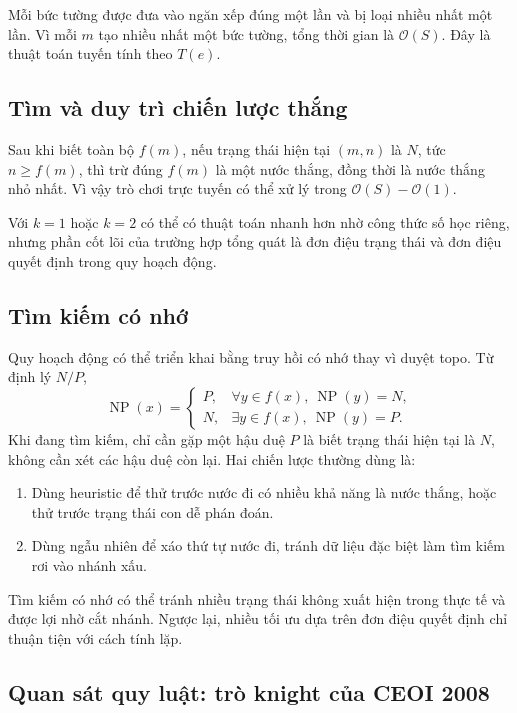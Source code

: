 \documentclass[11pt]{article}
\newcommand{\Oh}{\mathcal{O}}
\newcommand{\NP}{\operatorname{NP}}
\begin{document}
Mỗi bức tường được đưa vào ngăn xếp đúng một lần và bị loại nhiều nhất một
lần. Vì mỗi \(m\) tạo nhiều nhất một bức tường, tổng thời gian là \(\Oh(S)\).
Đây là thuật toán tuyến tính theo \(T(e)\).

\subsection{Tìm và duy trì chiến lược thắng}

Sau khi biết toàn bộ \(f(m)\), nếu trạng thái hiện tại \((m,n)\) là \(N\), tức
\(n\ge f(m)\), thì trừ đúng \(f(m)\) là một nước thắng, đồng thời là nước thắng
nhỏ nhất. Vì vậy trò chơi trực tuyến có thể xử lý trong
\(\Oh(S)-\Oh(1)\).

Với \(k=1\) hoặc \(k=2\) có thể có thuật toán nhanh hơn nhờ công thức số học
riêng, nhưng phần cốt lõi của trường hợp tổng quát là đơn điệu trạng thái và
đơn điệu quyết định trong quy hoạch động.

\subsection{Tìm kiếm có nhớ}

Quy hoạch động có thể triển khai bằng truy hồi có nhớ thay vì duyệt topo. Từ
định lý \(N/P\),
\[
\NP(x)=
\begin{cases}
  P, & \forall y\in f(x),\ \NP(y)=N,\\
  N, & \exists y\in f(x),\ \NP(y)=P.
\end{cases}
\]
Khi đang tìm kiếm, chỉ cần gặp một hậu duệ \(P\) là biết trạng thái hiện tại
là \(N\), không cần xét các hậu duệ còn lại. Hai chiến lược thường dùng là:
\begin{enumerate}
  \item Dùng heuristic để thử trước nước đi có nhiều khả năng là nước thắng,
  hoặc thử trước trạng thái con dễ phán đoán.
  \item Dùng ngẫu nhiên để xáo thứ tự nước đi, tránh dữ liệu đặc biệt làm tìm
  kiếm rơi vào nhánh xấu.
\end{enumerate}

Tìm kiếm có nhớ có thể tránh nhiều trạng thái không xuất hiện trong thực tế và
được lợi nhờ cắt nhánh. Ngược lại, nhiều tối ưu dựa trên đơn điệu quyết định
chỉ thuận tiện với cách tính lặp.

\subsection{Quan sát quy luật: trò knight của CEOI 2008}
\end{document}
